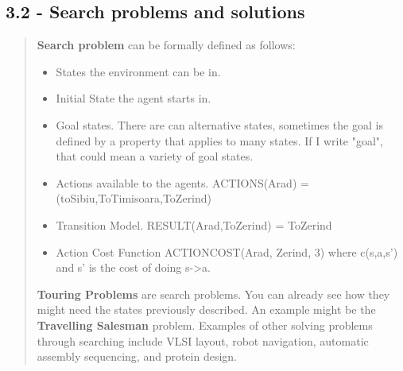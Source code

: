 \documentclass{article}
\begin{document}
\subsection{3.2 - Search problems and solutions}
\begin{quote}
    \textbf{Search problem} can be formally defined as follows:
    \begin{itemize}
        \item States the environment can be in.
        \item Initial State the agent starts in.
        \item Goal states. There are can alternative states, sometimes the goal is defined by a property that applies to many states. If I write "goal", that could mean a variety of goal states.
        \item Actions available to the agents. ACTIONS(Arad) = (toSibiu,ToTimisoara,ToZerind)
        \item Transition Model. RESULT(Arad,ToZerind) = ToZerind
        \item Action Cost Function ACTIONCOST(Arad, Zerind, 3) where c(s,a,s') and s' is the cost of doing s->a.
    \end{itemize}
    \textbf{Touring Problems} are search problems. You can already see how they might need the states previously described. An example might be the \textbf{Travelling Salesman} problem. Examples of other solving problems through searching include VLSI layout,
    robot navigation, automatic assembly sequencing, and protein design.
\end{quote}
\end{document}
